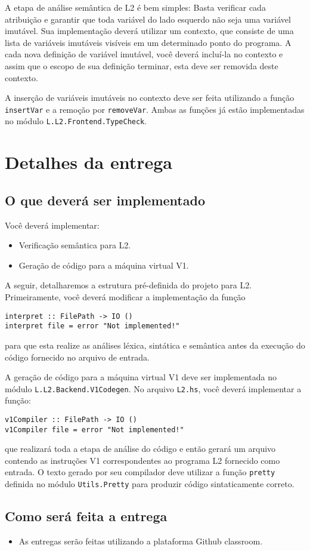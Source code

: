 \documentclass[a4paper,11pt]{article}
\begin{document}
A etapa de análise semântica de L2 é bem simples: Basta verificar cada atribuição e garantir
que toda variável do lado esquerdo não seja uma variável imutável. Sua implementação deverá
utilizar um contexto, que consiste de uma lista de variáveis imutáveis visíveis em um determinado
ponto do programa. A cada nova definição de variável imutável, você deverá incluí-la no contexto e
assim que o escopo de sua definição terminar, esta deve ser removida deste contexto.

A inserção de variáveis imutáveis no contexto deve ser feita utilizando a função \texttt{insertVar} e
a remoção por \texttt{removeVar}. Ambas as funções já estão implementadas no
módulo \texttt{L.L2.Frontend.TypeCheck}.
\section*{Detalhes da entrega}
\label{sec:orga1155b4}

\subsection*{O que deverá ser implementado}
\label{sec:org7d24b72}

Você deverá implementar:

\begin{itemize}
\item Verificação semântica para L2.

\item Geração de código para a máquina virtual V1.
\end{itemize}

A seguir, detalharemos a estrutura pré-definida do projeto para L2.
Primeiramente, você deverá modificar a implementação da função
\begin{verbatim}
interpret :: FilePath -> IO ()
interpret file = error "Not implemented!"
\end{verbatim}
para que esta realize as análises léxica, sintática e semântica antes da
execução do código fornecido no arquivo de entrada.

A geração de código para a máquina virtual V1 deve ser implementada no módulo
\texttt{L.L2.Backend.V1Codegen}. No arquivo \texttt{L2.hs}, você deverá implementar a função:

\begin{verbatim}
v1Compiler :: FilePath -> IO ()
v1Compiler file = error "Not implemented!"
\end{verbatim}

que realizará toda a etapa de análise do código e então gerará um arquivo contendo
as instruções V1 correspondentes ao programa L2 fornecido como entrada. O texto
gerado por seu compilador deve utilizar a função \texttt{pretty} definida no módulo
\texttt{Utils.Pretty} para produzir código sintaticamente correto.
\subsection*{Como será feita a entrega}
\label{sec:org13fbc34}

\begin{itemize}
\item As entregas serão feitas utilizando a plataforma Github classroom.
\end{itemize}
\end{document}
